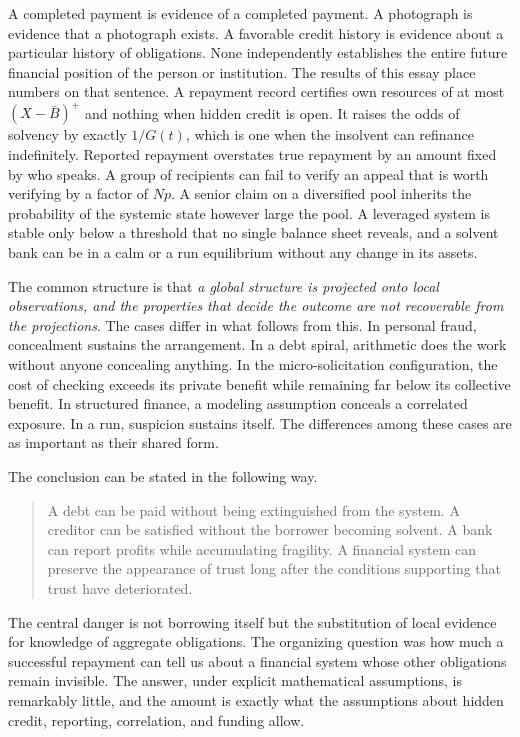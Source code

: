 \documentclass[11pt]{article}
\theoremstyle{definition}
\theoremstyle{remark}
\begin{document}
A completed payment is evidence of a completed payment. A photograph is evidence that a photograph exists. A favorable credit history is evidence about a particular history of obligations. None independently establishes the entire future financial position of the person or institution. The results of this essay place numbers on that sentence. A repayment record certifies own resources of at most $(X-\bar B)^+$ and nothing when hidden credit is open. It raises the odds of solvency by exactly $1/G(t)$, which is one when the insolvent can refinance indefinitely. Reported repayment overstates true repayment by an amount fixed by who speaks. A group of recipients can fail to verify an appeal that is worth verifying by a factor of $Np$. A senior claim on a diversified pool inherits the probability of the systemic state however large the pool. A leveraged system is stable only below a threshold that no single balance sheet reveals, and a solvent bank can be in a calm or a run equilibrium without any change in its assets.

The common structure is that \emph{a global structure is projected onto local observations, and the properties that decide the outcome are not recoverable from the projections}. The cases differ in what follows from this. In personal fraud, concealment sustains the arrangement. In a debt spiral, arithmetic does the work without anyone concealing anything. In the micro-solicitation configuration, the cost of checking exceeds its private benefit while remaining far below its collective benefit. In structured finance, a modeling assumption conceals a correlated exposure. In a run, suspicion sustains itself. The differences among these cases are as important as their shared form.

The conclusion can be stated in the following way.

\begin{quote}
A debt can be paid without being extinguished from the system. A creditor can be satisfied without the borrower becoming solvent. A bank can report profits while accumulating fragility. A financial system can preserve the appearance of trust long after the conditions supporting that trust have deteriorated.
\end{quote}

The central danger is not borrowing itself but the substitution of local evidence for knowledge of aggregate obligations. The organizing question was how much a successful repayment can tell us about a financial system whose other obligations remain invisible. The answer, under explicit mathematical assumptions, is remarkably little, and the amount is exactly what the assumptions about hidden credit, reporting, correlation, and funding allow.
\end{document}
